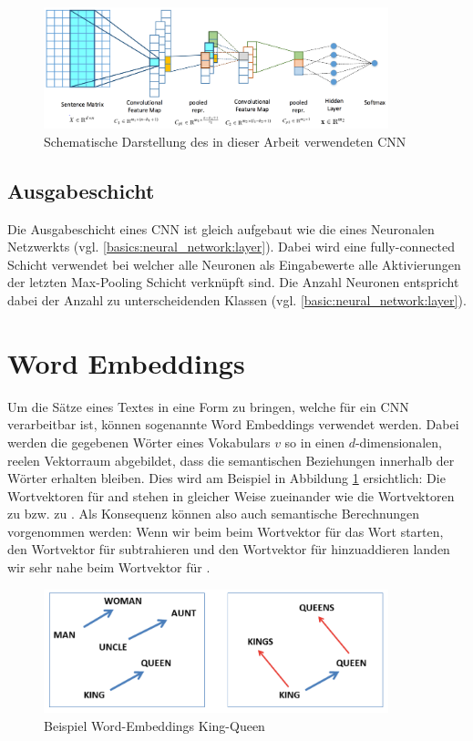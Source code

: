 \begin{figure}[h]
	\centering
	\includegraphics[width=10cm]{img/semeval_cnn_structure}
	\caption{Schematische Darstellung des in dieser Arbeit verwendeten CNN \protect\cite{deriu2016swisscheese}}
\end{figure}

\subsection{Ausgabeschicht}
\label{basic:cnn:output_layer}
Die Ausgabeschicht eines CNN ist gleich aufgebaut wie die eines  Neuronalen Netzwerkts (vgl. \ref{basics:neural_network:layer}). Dabei wird eine fully-connected Schicht verwendet bei welcher alle Neuronen als Eingabewerte alle Aktivierungen der letzten Max-Pooling Schicht verknüpft sind. Die Anzahl Neuronen entspricht dabei der Anzahl zu unterscheidenden Klassen (vgl. \ref{basic:neural_network:layer}).

\section{Word Embeddings}
Um die Sätze eines Textes in eine Form zu bringen, welche für ein CNN verarbeitbar ist, können sogenannte Word Embeddings verwendet werden. Dabei werden die gegebenen Wörter eines Vokabulars $v$ so in einen $d$-dimensionalen, reelen Vektorraum abgebildet, dass die semantischen Beziehungen innerhalb der Wörter erhalten bleiben. Dies wird am Beispiel in Abbildung \ref{basic:word_embeddings:king_queen_example} ersichtlich: Die Wortvektoren für  and  stehen in gleicher Weise zueinander wie die Wortvektoren  zu  bzw.  zu . Als Konsequenz können also auch semantische Berechnungen vorgenommen werden: Wenn wir beim beim Wortvektor für das Wort  starten, den Wortvektor für  subtrahieren und den Wortvektor für  hinzuaddieren landen wir sehr nahe beim Wortvektor für .\\

\begin{figure}[H]
	\label{basic:word_embeddings:king_queen_example}
	\centering
	\includegraphics[width=10cm]{img/king_queen_example_word_embeddings}
	\caption{Beispiel Word-Embeddings King-Queen}
\end{figure}


